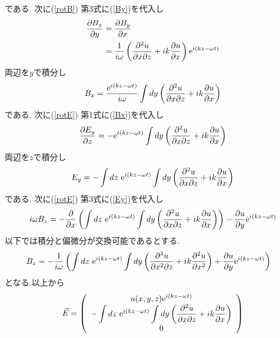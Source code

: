 \documentclass[uplatex,a4j,11pt,dvipdfmx]{jsarticle}
\numberwithin{equation}{section}
\begin{document}
である.
次に(\ref{rotB}) 第3式に(\ref{By})を代入し
\begin{align}
  \begin{split}
    \frac{\partial B_x}{\partial y}&=\frac{\partial B_y}{\partial x}\\
    &=\frac{1}{i\omega}\left(\frac{\partial^2u}{\partial x\partial z}+ik\frac{\partial u}{\partial x}\right){\rm e}^{i(kz-\omega t)}
  \end{split}
\end{align}
両辺を$y$で積分し
\begin{align}
  \label{Bx}
  B_x=\frac{{\rm e}^{i(kz-\omega t)}}{i\omega}\int dy\left(\frac{\partial^2u}{\partial x\partial z}+ik\frac{\partial u}{\partial x}\right)
\end{align}
である.
次に(\ref{rotE}) 第1式に(\ref{Bx})を代入し
\begin{align}
    \frac{\partial E_y}{\partial z}=-{\rm e}^{i(kz-\omega t)}\int dy\left(\frac{\partial^2u}{\partial x\partial z}+ik\frac{\partial u}{\partial x}\right)
\end{align}
両辺を$z$で積分し
\begin{align}
  \label{Ey}
  E_y=-\int dz\ {\rm e}^{i(kz-\omega t)}\int dy\left(\frac{\partial^2u}{\partial x\partial z}+ik\frac{\partial u}{\partial x}\right)
\end{align}
である.
次に(\ref{rotE}) 第3式に(\ref{Ey})を代入し
\begin{align}
  \begin{split}
    i\omega B_z&=-\frac{\partial}{\partial x}\left(\int dz\ {\rm e}^{i(kz-\omega t)}\int dy\left(\frac{\partial^2u}{\partial x\partial z}+ik\frac{\partial u}{\partial x}\right)\right)
    -\frac{\partial u}{\partial y}{\rm e}^{i(kz-\omega t)}\\
  \end{split}
\end{align}
以下では積分と偏微分が交換可能であるとする.
\begin{align}
  \begin{split}
    B_z&=-\frac{1}{i\omega}\left(\int dz\ {\rm e}^{i(kz-\omega t)}\int dy\left(
      \frac{\partial^3u}{\partial x^2\partial z}+ik\frac{\partial^2u}{\partial x^2}
    \right)+\frac{\partial u}{\partial y}{\rm e}^{i(kz-\omega t)}\right)
  \end{split}
\end{align}
となる.以上から
\begin{align}
  \vec{E}=\left(
    \begin{array}[1]{c}
      \displaystyle
      u(x,y,z){\rm e}^{i(kz-\omega t)}\\
      \displaystyle
      -\int dz\ {\rm e}^{i(kz-\omega t)}\int dy\left(\frac{\partial^2u}{\partial x\partial z}+ik\frac{\partial u}{\partial x}\right)\\
      0
    \end{array}
  \right)
\end{align}
\end{document}
